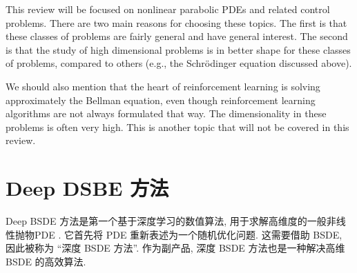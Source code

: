 \documentclass[12pt,AutoFakeBold,AutoFakeSlant]{article}
\theoremstyle{definition}
\begin{document}
	This review will be focused on nonlinear parabolic PDEs and related control problems.
	There are two main reasons for choosing these topics. The first is that these classes of problems are fairly general
	and have general interest.  The second is that the study of high dimensional problems  is in better shape for these classes of problems, compared to others (e.g., the Schr\"odinger equation discussed above).

	We should also mention that the heart of reinforcement learning is solving approximately the Bellman equation, even though reinforcement learning
	algorithms are not always formulated that way. The dimensionality in these problems is often very high. This is another topic that will not be
	covered in this review.





	\section{Deep DSBE 方法}
	Deep BSDE 方法是第一个基于深度学习的数值算法, 用于求解高维度的一般非线性抛物PDE \cite{EHanJentzen2017, HanJentzenE2018}. 它首先将 PDE 重新表述为一个随机优化问题. 这需要借助 BSDE, 因此被称为 ``深度 BSDE 方法''. 作为副产品, 深度 BSDE 方法也是一种解决高维 BSDE 的高效算法.

	\label{sec:nonlinear_PDEs}
\end{document}
